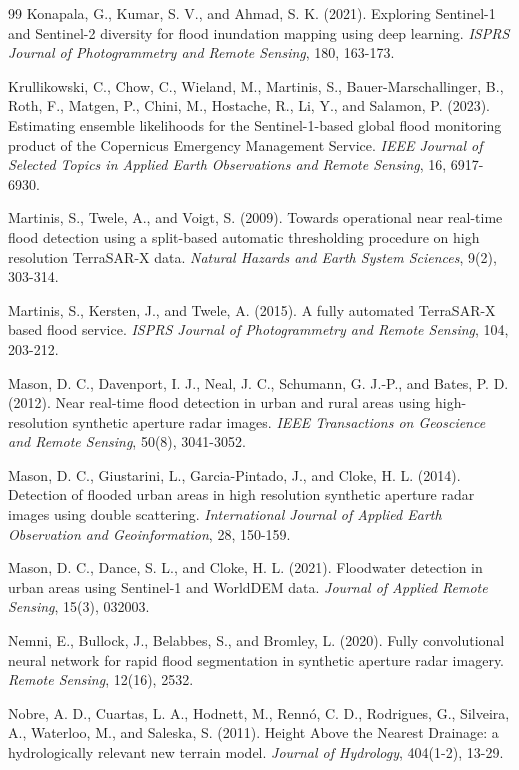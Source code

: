 \documentclass[11pt]{article}
\begin{document}
\begin{thebibliography}{99}
Konapala, G., Kumar, S. V., and Ahmad, S. K. (2021). Exploring Sentinel-1 and
Sentinel-2 diversity for flood inundation mapping using deep learning.
\textit{ISPRS Journal of Photogrammetry and Remote Sensing}, 180, 163-173.

Krullikowski, C., Chow, C., Wieland, M., Martinis, S., Bauer-Marschallinger,
B., Roth, F., Matgen, P., Chini, M., Hostache, R., Li, Y., and Salamon, P.
(2023). Estimating ensemble likelihoods for the Sentinel-1-based global flood
monitoring product of the Copernicus Emergency Management Service.
\textit{IEEE Journal of Selected Topics in Applied Earth Observations and
Remote Sensing}, 16, 6917-6930.

Martinis, S., Twele, A., and Voigt, S. (2009). Towards operational near
real-time flood detection using a split-based automatic thresholding procedure
on high resolution TerraSAR-X data. \textit{Natural Hazards and Earth System
Sciences}, 9(2), 303-314.

Martinis, S., Kersten, J., and Twele, A. (2015). A fully automated TerraSAR-X
based flood service. \textit{ISPRS Journal of Photogrammetry and Remote
Sensing}, 104, 203-212.

Mason, D. C., Davenport, I. J., Neal, J. C., Schumann, G. J.-P., and Bates,
P. D. (2012). Near real-time flood detection in urban and rural areas using
high-resolution synthetic aperture radar images. \textit{IEEE Transactions on
Geoscience and Remote Sensing}, 50(8), 3041-3052.

Mason, D. C., Giustarini, L., Garcia-Pintado, J., and Cloke, H. L. (2014).
Detection of flooded urban areas in high resolution synthetic aperture radar
images using double scattering. \textit{International Journal of Applied Earth
Observation and Geoinformation}, 28, 150-159.

Mason, D. C., Dance, S. L., and Cloke, H. L. (2021). Floodwater detection in
urban areas using Sentinel-1 and WorldDEM data. \textit{Journal of Applied
Remote Sensing}, 15(3), 032003.

Nemni, E., Bullock, J., Belabbes, S., and Bromley, L. (2020). Fully
convolutional neural network for rapid flood segmentation in synthetic
aperture radar imagery. \textit{Remote Sensing}, 12(16), 2532.

Nobre, A. D., Cuartas, L. A., Hodnett, M., Renn\'o, C. D., Rodrigues, G.,
Silveira, A., Waterloo, M., and Saleska, S. (2011). Height Above the Nearest
Drainage: a hydrologically relevant new terrain model. \textit{Journal of
Hydrology}, 404(1-2), 13-29.


\end{thebibliography}
\end{document}
